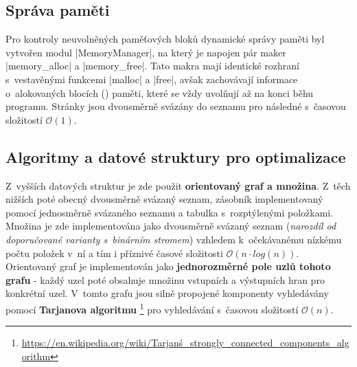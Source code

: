 \subsection{Správa paměti}
Pro kontroly neuvolněných paměťových bloků dynamické správy paměti byl vytvořen modul \ic|MemoryManager|, na který je napojen pár maker \ic|memory_alloc| a \ic|memory_free|. Tato makra mají identické rozhraní s~vestavěnými funkcemi \ic|malloc| a \ic|free|, avšak zachovávají informace o~alokovaných blocích () paměti, které se vždy uvolňují až na konci běhu programu. Stránky jsou dvousměrně svázány do seznamu pro následné  s~časovou složitostí $\mathcal{O}(1)$.

\subsection{Algoritmy a datové struktury pro optimalizace}
Z~vyšších datových struktur je zde použit \textbf{orientovaný graf a množina}. Z~těch nižších poté obecný dvousměrně svázaný seznam, zásobník implementovaný pomocí jednosměrně svázaného seznamu a tabulka s~rozptýlenými položkami. Množina je zde implementována jako dvousměrně svázaný seznam (\emph{narozdíl od doporučované varianty s~binárním stromem}) vzhledem k~očekávanému nízkému počtu položek v~ní a tím i příznivé časové složitosti $\mathcal{O}(n\cdot log(n))$. Orientovaný graf je implementován jako \textbf{jednorozměrné pole uzlů tohoto grafu} - každý uzel poté obsahuje množinu vstupních a výstupních hran pro konkrétní uzel. V~tomto grafu jsou silně propojené komponenty vyhledávány pomocí \textbf{Tarjanova algoritmu} \footnote{\href{https://en.wikipedia.org/wiki/Tarjan\'s\_strongly\_connected\_components\_algorithm}{https://en.wikipedia.org/wiki/Tarjan\'s\_strongly\_connected\_components\_algorithm}} pro vyhledávání s~časovou složitostí $\mathcal{O}(n)$.